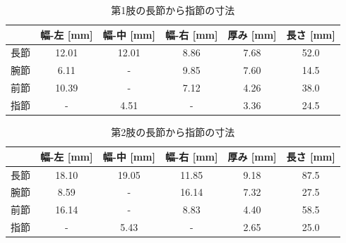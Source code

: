 \begin{table}[htbp]
  \centering
  \caption{第1肢の長節から指節の寸法}
  \label{tab:1setu}
  \vspace{-3mm}
  \begin{tabular}{|l|c|c|c|c|c|}
  \hline
     & \multicolumn{1}{l|}{幅-左 [mm]} & \multicolumn{1}{l|}{幅-中 [mm]} & \multicolumn{1}{l|}{幅-右 [mm]} & \multicolumn{1}{l|}{厚み [mm]} & \multicolumn{1}{l|}{長さ [mm]} \\ \hline
  長節 & 12.01                       & 12.01                       & 8.86                        & 7.68                        & 52.0                        \\ \hline
  腕節 & 6.11                        & -                           & 9.85                        & 7.60                        & 14.5                        \\ \hline
  前節 & 10.39                       & -                           & 7.12                        & 4.26                        & 38.0                        \\ \hline
  指節 & -                           & 4.51                        & -                           & 3.36                        & 24.5                        \\ \hline
  \end{tabular}
\end{table}
%
\begin{table}[htbp]
  \centering
  \caption{第2肢の長節から指節の寸法}
  \label{tab:2setu}
  \vspace{-3mm}
  \begin{tabular}{|l|c|c|c|c|c|}
  \hline
     & \multicolumn{1}{l|}{幅-左 [mm]} & \multicolumn{1}{l|}{幅-中 [mm]} & \multicolumn{1}{l|}{幅-右 [mm]} & \multicolumn{1}{l|}{厚み [mm]} & \multicolumn{1}{l|}{長さ [mm]} \\ \hline
  長節 & 18.10                       & 19.05                       & 11.85                       & 9.18                        & 87.5                        \\ \hline
  腕節 & 8.59                        & -                           & 16.14                       & 7.32                        & 27.5                        \\ \hline
  前節 & 16.14                       & -                           & 8.83                        & 4.40                        & 58.5                        \\ \hline
  指節 & -                           & 5.43                        & -                           & 2.65                        & 25.0                        \\ \hline
  \end{tabular}
\end{table}
